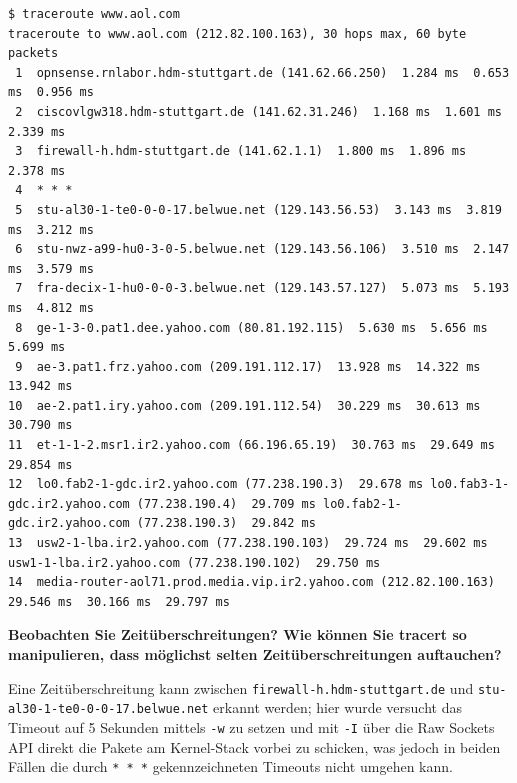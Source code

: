 \begin{verbatim}
$ traceroute www.aol.com
traceroute to www.aol.com (212.82.100.163), 30 hops max, 60 byte packets
 1  opnsense.rnlabor.hdm-stuttgart.de (141.62.66.250)  1.284 ms  0.653 ms  0.956 ms
 2  ciscovlgw318.hdm-stuttgart.de (141.62.31.246)  1.168 ms  1.601 ms  2.339 ms
 3  firewall-h.hdm-stuttgart.de (141.62.1.1)  1.800 ms  1.896 ms  2.378 ms
 4  * * *
 5  stu-al30-1-te0-0-0-17.belwue.net (129.143.56.53)  3.143 ms  3.819 ms  3.212 ms
 6  stu-nwz-a99-hu0-3-0-5.belwue.net (129.143.56.106)  3.510 ms  2.147 ms  3.579 ms
 7  fra-decix-1-hu0-0-0-3.belwue.net (129.143.57.127)  5.073 ms  5.193 ms  4.812 ms
 8  ge-1-3-0.pat1.dee.yahoo.com (80.81.192.115)  5.630 ms  5.656 ms  5.699 ms
 9  ae-3.pat1.frz.yahoo.com (209.191.112.17)  13.928 ms  14.322 ms  13.942 ms
10  ae-2.pat1.iry.yahoo.com (209.191.112.54)  30.229 ms  30.613 ms  30.790 ms
11  et-1-1-2.msr1.ir2.yahoo.com (66.196.65.19)  30.763 ms  29.649 ms  29.854 ms
12  lo0.fab2-1-gdc.ir2.yahoo.com (77.238.190.3)  29.678 ms lo0.fab3-1-gdc.ir2.yahoo.com (77.238.190.4)  29.709 ms lo0.fab2-1-gdc.ir2.yahoo.com (77.238.190.3)  29.842 ms
13  usw2-1-lba.ir2.yahoo.com (77.238.190.103)  29.724 ms  29.602 ms usw1-1-lba.ir2.yahoo.com (77.238.190.102)  29.750 ms
14  media-router-aol71.prod.media.vip.ir2.yahoo.com (212.82.100.163)  29.546 ms  30.166 ms  29.797 ms
\end{verbatim}

\textbf{Beobachten Sie Zeitüberschreitungen? Wie können Sie tracert so
manipulieren, dass möglichst selten Zeitüberschreitungen auftauchen?}

Eine Zeitüberschreitung kann zwischen
\texttt{firewall-h.hdm-stuttgart.de} und
\texttt{stu-al30-1-te0-0-0-17.belwue.net} erkannt werden; hier wurde
versucht das Timeout auf 5 Sekunden mittels \texttt{-w} zu setzen und
mit \texttt{-I} über die Raw Sockets API direkt die Pakete am
Kernel-Stack vorbei zu schicken, was jedoch in beiden Fällen die durch
\texttt{*\ *\ *} gekennzeichneten Timeouts nicht umgehen kann.

